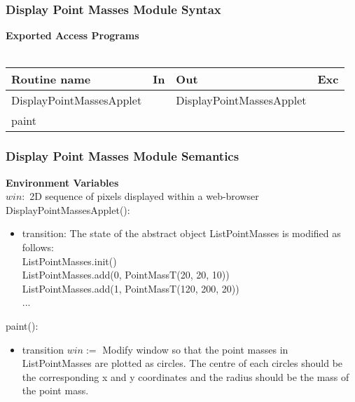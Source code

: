 \documentclass[t,12pt,numbers,fleqn,handout]{beamer}
\begin{document}

\begin{frame}
\frametitle{Display Point Masses Module Syntax}

\textbf{Exported Access Programs}\\
~\newline
\begin{tabular}{| l | l | l | l |}
\hline
\textbf{Routine name} & \textbf{In} & \textbf{Out} & \textbf{Exc}\\
\hline
DisplayPointMassesApplet & ~ & DisplayPointMassesApplet & ~\\
\hline
paint & ~ & ~ & ~\\
\hline
\end{tabular}

\end{frame}


\begin{frame}
\frametitle{Display Point Masses Module Semantics}

\textbf{Environment Variables}\\
$\mathit{win}:$ 2D sequence of pixels displayed within a web-browser \\

\noindent DisplayPointMassesApplet():
\begin{itemize}
\item transition: The state of the abstract object ListPointMasses is modified as follows:\\
ListPointMasses.init()\\
ListPointMasses.add(0, PointMassT(20, 20, 10))\\
ListPointMasses.add(1, PointMassT(120, 200, 20))\\
...
\end{itemize}

\noindent paint():
\begin{itemize}
\item transition $win := $ Modify window so that the point masses in ListPointMasses 
are plotted as circles.  The centre of each circles should be the corresponding x and y coordinates and the radius should
be the mass of the point mass.
\end{itemize}

\end{frame}

\end{document}
